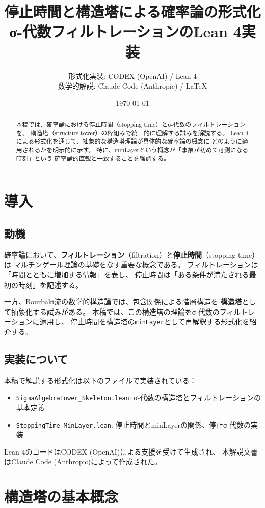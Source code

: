 \documentclass[a4paper,12pt]{ltjsarticle}
\title{停止時間と構造塔による確率論の形式化\\
{\large σ-代数フィルトレーションのLean 4実装}}
\author{%
  形式化実装: CODEX (OpenAI) / Lean 4 \\
  数学的解説: Claude Code (Anthropic) / \LaTeX{}
}
\date{\today}
\theoremstyle{definition}
\begin{document}
\maketitle

\begin{abstract}
本稿では、確率論における停止時間（stopping time）とσ-代数のフィルトレーションを、
構造塔（structure tower）の枠組みで統一的に理解する試みを解説する。
Lean 4による形式化を通じて、抽象的な構造塔理論が具体的な確率論の概念に
どのように適用されるかを明示的に示す。
特に、minLayerという概念が「事象が初めて可測になる時刻」という
確率論的直観と一致することを強調する。
\end{abstract}

\tableofcontents

\section{導入}

\subsection{動機}
確率論において、\textbf{フィルトレーション}（filtration）と\textbf{停止時間}（stopping time）は
マルチンゲール理論の基礎をなす重要な概念である。
フィルトレーションは「時間とともに増加する情報」を表し、
停止時間は「ある条件が満たされる最初の時刻」を記述する。

一方、Bourbaki流の数学的構造論では、包含関係による階層構造を
\textbf{構造塔}として抽象化する試みがある。
本稿では、この構造塔の理論をσ-代数のフィルトレーションに適用し、
停止時間を構造塔の\texttt{minLayer}として再解釈する形式化を紹介する。

\subsection{実装について}
本稿で解説する形式化は以下のファイルで実装されている：
\begin{itemize}
  \item \texttt{SigmaAlgebraTower\_Skeleton.lean}:
        σ-代数の構造塔とフィルトレーションの基本定義
  \item \texttt{StoppingTime\_MinLayer.lean}:
        停止時間とminLayerの関係、停止σ-代数の実装
\end{itemize}

Lean 4のコードはCODEX (OpenAI)による支援を受けて生成され、
本解説文書はClaude Code (Anthropic)によって作成された。

\section{構造塔の基本概念}
\end{document}
